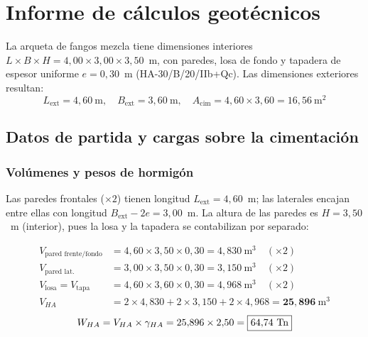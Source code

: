 \section{Informe de cálculos geotécnicos}
\label{sec:arqueta_geotecnia}

La arqueta de fangos mezcla tiene dimensiones interiores
$L\times B\times H = 4{,}00\times3{,}00\times3{,}50$~m,
con paredes, losa de fondo y tapadera de espesor uniforme $e = 0{,}30$~m
(HA-30/B/20/IIb+Qc). Las dimensiones exteriores resultan:
\[
  L_\text{ext} = 4{,}60~\text{m},\quad
  B_\text{ext} = 3{,}60~\text{m},\quad
  A_\text{cim} = 4{,}60\times3{,}60 = 16{,}56~\text{m}^2
\]

\subsection{Datos de partida y cargas sobre la cimentación}
\label{subsec:cargas_arqueta}

\subsubsection{Volúmenes y pesos de hormigón}

Las paredes frontales ($\times2$) tienen longitud $L_\text{ext}=4{,}60$~m;
las laterales encajan entre ellas con longitud
$B_\text{ext}-2e = 3{,}00$~m. La altura de las paredes es $H=3{,}50$~m (interior),
pues la losa y la tapadera se contabilizan por separado:

\begin{align*}
  V_\text{pared frente/fondo} &= 4{,}60\times3{,}50\times0{,}30 = 4{,}830~\text{m}^3
    \quad(\times2)\\
  V_\text{pared lat.}         &= 3{,}00\times3{,}50\times0{,}30 = 3{,}150~\text{m}^3
    \quad(\times2)\\
  V_\text{losa} = V_\text{tapa} &= 4{,}60\times3{,}60\times0{,}30 = 4{,}968~\text{m}^3
    \quad(\times2)\\
  V_{HA} &= 2\times4{,}830 + 2\times3{,}150 + 2\times4{,}968
          = \mathbf{25{,}896}~\text{m}^3
\end{align*}
\[
  W_{HA} = V_{HA}\times\gamma_{HA} = 25{,}896\times2{,}50
         = \boxed{64{,}74~\text{Tn}}
\]

